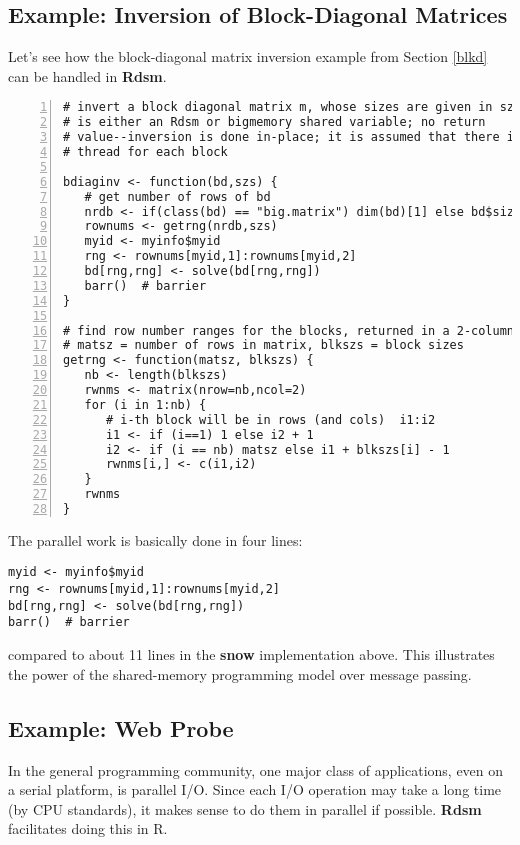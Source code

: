 \subsection{Example:  Inversion of Block-Diagonal Matrices}

Let's see how the block-diagonal matrix inversion example from Section
\ref{blkd} can be handled in {\bf Rdsm}.

\begin{lstlisting}[numbers=left]
# invert a block diagonal matrix m, whose sizes are given in szs; here m
# is either an Rdsm or bigmemory shared variable; no return
# value--inversion is done in-place; it is assumed that there is one
# thread for each block

bdiaginv <- function(bd,szs) {
   # get number of rows of bd
   nrdb <- if(class(bd) == "big.matrix") dim(bd)[1] else bd$size[1]
   rownums <- getrng(nrdb,szs)
   myid <- myinfo$myid
   rng <- rownums[myid,1]:rownums[myid,2]
   bd[rng,rng] <- solve(bd[rng,rng])
   barr()  # barrier
}

# find row number ranges for the blocks, returned in a 2-column matrix; 
# matsz = number of rows in matrix, blkszs = block sizes
getrng <- function(matsz, blkszs) {
   nb <- length(blkszs)
   rwnms <- matrix(nrow=nb,ncol=2)
   for (i in 1:nb) {
      # i-th block will be in rows (and cols)  i1:i2
      i1 <- if (i==1) 1 else i2 + 1
      i2 <- if (i == nb) matsz else i1 + blkszs[i] - 1
      rwnms[i,] <- c(i1,i2)
   }
   rwnms
}
\end{lstlisting}

The parallel work is basically done in four lines:

\begin{lstlisting}
myid <- myinfo$myid
rng <- rownums[myid,1]:rownums[myid,2]
bd[rng,rng] <- solve(bd[rng,rng])
barr()  # barrier
\end{lstlisting}

compared to about 11 lines in the {\bf snow} implementation above.  This 
illustrates the power of the shared-memory programming model over
message passing.

\subsection{Example:  Web Probe}

In the general programming community, one major class of applications,
even on a serial platform, is parallel I/O.  Since each I/O operation
may take a long time (by CPU standards), it makes sense to do them in
parallel if possible.  {\bf Rdsm} facilitates doing this in R.

